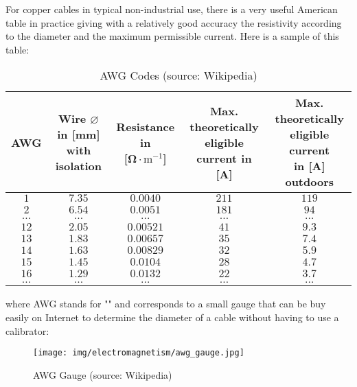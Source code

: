 	For copper cables in typical non-industrial use, there is a very useful American table in practice giving with a relatively good accuracy the resistivity according to the diameter and the maximum permissible current. Here is a sample of this table:
	\begin{table}[H]
		\begin{center}
				\begin{tabular}{|c|c|c|c|c|}
					\hline
					\multicolumn{1}{c}{\cellcolor{black!30}\textbf{AWG}} & 
	  \multicolumn{1}{c}{\cellcolor{black!30}\parbox{3cm}{\textbf{Wire $\varnothing$ in [mm]} \\ \textbf{with isolation}}} & \multicolumn{1}{c}{\cellcolor{black!30}\parbox{2.5cm}{\textbf{Resistance in} \\ \textbf{[$\boldsymbol{\Omega}\cdot\text{m}^{-1}$]}}}  & \multicolumn{1}{c}{\cellcolor{black!30}\parbox{4.7cm}{\textbf{Max. theoretically} \\ \textbf{eligible current in [A]}}} & \multicolumn{1}{c}{\cellcolor{black!30}\parbox{3.5cm}{\textbf{Max. theoretically} \\ \textbf{eligible current} \\ \textbf{in [A] outdoors}}}  \\ \hline
					$1$ & $7.35$ & $0.0040$ & $211$ & $119$ \\ \hline
					$2$ & $6.54$ & $0.0051$ & $181$ & $94$ \\ \hline
					$\ldots$ & $\ldots$ & $\ldots$ & $\ldots$ & $\ldots$ \\ 	\hline
					$12$ & $2.05$ & $0.00521$ & $41$ & $9.3$ \\ \hline
					$13$ & $1.83$ & $0.00657$ & $35$ & $7.4$ \\ \hline
					$14$ & $1.63$ & $0.00829$ & $32$ & $5.9$ \\ \hline
					$15$ & $1.45$ & $0.0104$ & $28$ & $4.7$ \\ \hline
					$16$ & $1.29$ & $0.0132$ & $22$ & $3.7$ \\ \hline
					$\ldots$ & $\ldots$ & $\ldots$ & $\ldots$ & $\ldots$ \\ \hline
			\end{tabular}
		\end{center}
		\caption[AWG Codes]{AWG Codes (source: Wikipedia)}
	\end{table}
	where AWG stands for "" and corresponds to a small gauge that can be buy easily on Internet to determine the diameter of a cable without having to use a calibrator:
	\begin{figure}[H]
		\centering
		\texttt{[image: img/electromagnetism/awg\_gauge.jpg]}
		\caption[AWG Gauge]{AWG Gauge (source: Wikipedia)}
	\end{figure}
	
